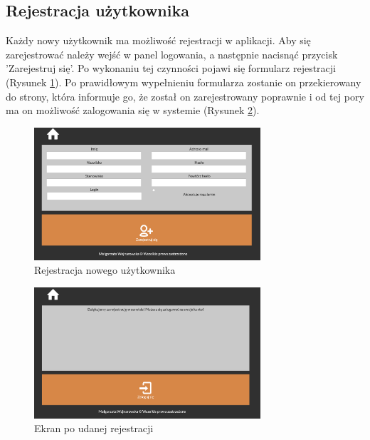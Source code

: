 \documentclass[eng,printmode,openany,oneside]{mgr}
\begin{document}
	
	
	
	
\newpage
	
	
	
	
	

\subsection{Rejestracja użytkownika}

Każdy nowy użytkownik ma możliwość rejestracji w aplikacji. Aby się zarejestrować należy wejść w panel logowania, a następnie nacisnąć przycisk 'Zarejestruj się'. Po wykonaniu tej czynności pojawi się formularz rejestracji (Rysunek \ref{fig:19}). Po prawidłowym wypełnieniu formularza zostanie on przekierowany do strony, która informuje go, że został on zarejestrowany poprawnie i od tej pory ma on możliwość zalogowania się w systemie (Rysunek \ref{fig:20}).

	\begin{figure}[H]
		\centering
		\includegraphics[width=0.75\textwidth]{rejestracja}
		\caption{Rejestracja nowego użytkownika}
		\label{fig:19}
	\end{figure}
	
	\begin{figure}[H]
		\centering
		\includegraphics[width=0.75\textwidth]{udana_rejestracja}
		\caption{Ekran po udanej rejestracji}
		\label{fig:20}
	\end{figure}
	
\end{document}
